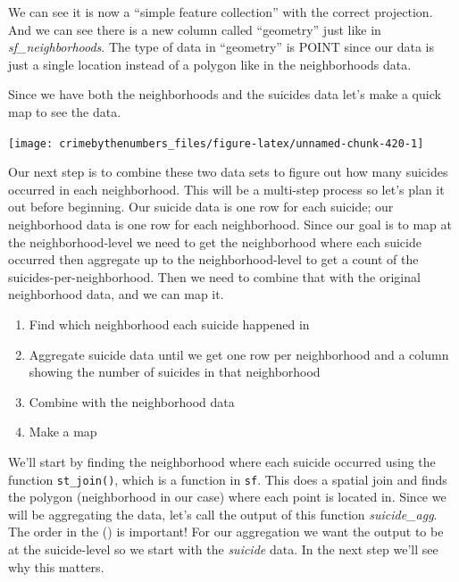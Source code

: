 \documentclass[
  a4paper,
]{krantz}
\makeatletter
\newenvironment{Shaded}{\begin{snugshade}}{\end{snugshade}}
\newcommand{\AttributeTok}[1]{\textcolor[rgb]{0.61,0.61,0.61}{#1}}
\newcommand{\ConstantTok}[1]{\textcolor[rgb]{0,0,0}{#1}}
\newcommand{\FunctionTok}[1]{\textcolor[rgb]{0,0,0}{#1}}
\newcommand{\NormalTok}[1]{#1}
\newcommand{\SpecialCharTok}[1]{\textcolor[rgb]{0,0,0}{#1}}
\newcommand{\StringTok}[1]{\textcolor[rgb]{0.5,0.5,0.5}{#1}}
\providecommand{\tightlist}{%
  \setlength{\itemsep}{0pt}\setlength{\parskip}{0pt}}
\newenvironment{kframe}{%
\medskip{}
\setlength{\fboxsep}{.8em}
 \def\at@end@of@kframe{}%
 \ifinner\ifhmode%
  \def\at@end@of@kframe{\end{minipage}}%
  \begin{minipage}{\columnwidth}%
 \fi\fi%
 \def\FrameCommand##1{\hskip\@totalleftmargin \hskip-\fboxsep
 \colorbox{shadecolor}{##1}\hskip-\fboxsep
     \hskip-\linewidth \hskip-\@totalleftmargin \hskip\columnwidth}%
 \MakeFramed {\advance\hsize-\width
   \@totalleftmargin\z@ \linewidth\hsize
   \@setminipage}}%
 {\par\unskip\endMakeFramed%
 \at@end@of@kframe}
\renewenvironment{Shaded}{\begin{kframe}}{\end{kframe}}
\makeatother
\begin{document}
We can see it is now a ``simple feature collection'' with
the correct projection. And we can see there is a new column
called ``geometry'' just like in \emph{sf\_neighborhoods}.
The type of data in ``geometry'' is POINT since our data is
just a single location instead of a polygon like in the
neighborhoods data.

Since we have both the neighborhoods and the suicides data
let's make a quick map to see the data.

\begin{Shaded}
\end{Shaded}

\begin{center}\texttt{[image: crimebythenumbers\_files/figure-latex/unnamed-chunk-420-1]} \end{center}

Our next step is to combine these two data sets to figure
out how many suicides occurred in each neighborhood. This
will be a multi-step process so let's plan it out before
beginning. Our suicide data is one row for each suicide; our
neighborhood data is one row for each neighborhood. Since
our goal is to map at the neighborhood-level we need to get
the neighborhood where each suicide occurred then aggregate
up to the neighborhood-level to get a count of the
suicides-per-neighborhood. Then we need to combine that with
the original neighborhood data, and we can map it.

\begin{enumerate}
\def\labelenumi{\arabic{enumi}.}
\tightlist
\item
  Find which neighborhood each suicide happened in
\item
  Aggregate suicide data until we get one row per
  neighborhood and a column showing the number of suicides
  in that neighborhood
\item
  Combine with the neighborhood data
\item
  Make a map
\end{enumerate}

We'll start by finding the neighborhood where each suicide
occurred using the function \texttt{st\_join()}, which is a
function in \texttt{sf}. This does a spatial join and finds
the polygon (neighborhood in our case) where each point is
located in. Since we will be aggregating the data, let's
call the output of this function \emph{suicide\_agg}. The
order in the () is important! For our aggregation we want
the output to be at the suicide-level so we start with the
\emph{suicide} data. In the next step we'll see why this
matters.
\end{document}
